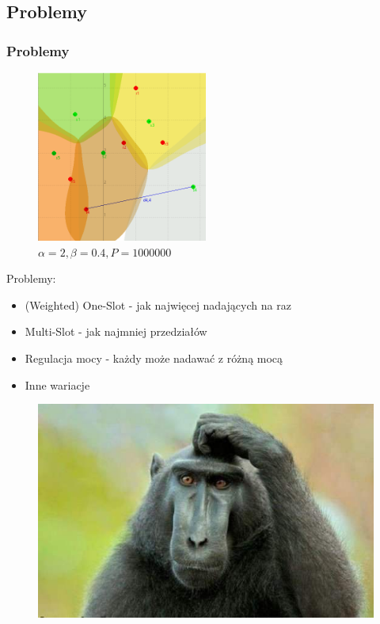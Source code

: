 \documentclass[polish, t,10pt]{beamer}
\begin{document}
\subsection{Problemy}
    \begin{frame}
        \frametitle{Problemy}
        \begin{figure}
            \includegraphics[width=0.5\textwidth]{pictures/model-diagram4.png}
            \caption{$\alpha=2, \beta=0.4, P=1000000$}
        \end{figure}
        Problemy:
        \begin{itemize}
            \item (Weighted) One-Slot - jak najwięcej nadających na raz
            \item Multi-Slot - jak najmniej przedziałów
            \item Regulacja mocy - każdy może nadawać z różną mocą
            \item Inne wariacje
        \end{itemize}
    \end{frame}

\begin{frame}[c]
    \begin{figure}
        \includegraphics[width=\textwidth]{pictures/obligatory-monkey.jpg}
    \end{figure}
\end{frame}
\end{document}

